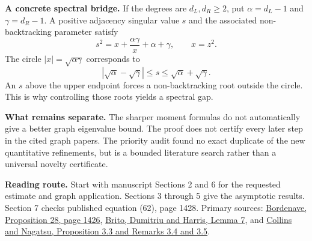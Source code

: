 \documentclass[11pt]{article}
\begin{document}
\textbf{A concrete spectral bridge.} If the degrees are $d_L,d_R\ge2$, put $\alpha=d_L-1$ and $\gamma=d_R-1$. A positive adjacency singular value $s$ and the associated non-backtracking parameter satisfy
\[
s^2=x+\frac{\alpha\gamma}{x}+\alpha+\gamma,\qquad x=z^2.
\]
The circle $|x|=\sqrt{\alpha\gamma}$ corresponds to
\[
|\sqrt\alpha-\sqrt\gamma|\le s\le\sqrt\alpha+\sqrt\gamma.
\]
An $s$ above the upper endpoint forces a non-backtracking root outside the circle. This is why controlling those roots yields a spectral gap.

\textbf{What remains separate.} The sharper moment formulas do not automatically give a better graph eigenvalue bound. The proof does not certify every later step in the cited graph papers. The priority audit found no exact duplicate of the new quantitative refinements, but is a bounded literature search rather than a universal novelty certificate.

\vfill
{\small\color{ink}\textbf{Reading route.} Start with manuscript Sections 2 and 6 for the requested estimate and graph application. Sections 3 through 5 give the asymptotic results. Section 7 checks published equation (62), page 1428. Primary sources: \href{https://smf.emath.fr/download/pdf/1498332}{Bordenave, Proposition 28, page 1426}, \href{https://arxiv.org/abs/1804.07808v6}{Brito, Dumitriu and Harris, Lemma 7}, and \href{https://doi.org/10.5802/alco.480}{Collins and Nagatsu, Proposition 3.3 and Remarks 3.4 and 3.5}.}
\end{document}
